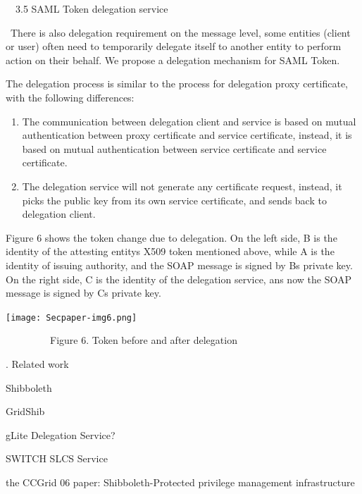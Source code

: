 \documentclass{article}
\newcommand\liststyleLv{%
\renewcommand\theenumi{\arabic{enumi}}
\renewcommand\theenumii{\arabic{enumii}}
\renewcommand\theenumiii{\arabic{enumiii}}
\renewcommand\theenumiv{\arabic{enumiv}}
\renewcommand\labelenumi{\theenumi.}
\renewcommand\labelenumii{\theenumii.}
\renewcommand\labelenumiii{\theenumiii.}
\renewcommand\labelenumiv{\theenumiv.}
}
\begin{document}
\bigskip

\ \ 3.5 SAML Token delegation service

\ There is also delegation requirement on the message level, some
entities (client or user) often need to temporarily delegate itself to
another entity to perform action on their behalf. We propose a
delegation mechanism for SAML Token. 

The delegation process is similar to the process for delegation proxy
certificate, with the following differences:

\liststyleLv
\begin{enumerate}
\item The communication between delegation client and service is based
on mutual authentication between proxy certificate and service
certificate, instead, it is based on mutual authentication between
service certificate and service certificate.
\item The delegation service will not generate any certificate request,
instead, it picks the public key from its own service certificate, and
sends back to delegation client.
\end{enumerate}
Figure 6 shows the token change due to delegation. On the left side, B
is the identity of the attesting entity{\textquotesingle}s X509 token
mentioned above, while A is the identity of issuing authority, and the
SOAP message is signed by B{\textquotesingle}s private key. On the
right side, C is the identity of the delegation service, ans now the
SOAP message is signed by C{\textquotesingle}s private key.


\bigskip



\begin{center}
\texttt{[image: Secpaper-img6.png]}
\end{center}
{\centering
\ \ \ \ \ \ \ \ \ Figure 6. Token before and after delegation
\par}


\bigskip


\bigskip


\bigskip


\bigskip

{. Related work
\par}

Shibboleth

GridShib

gLite Delegation Service?

SWITCH SLCS Service

the CCGrid 06 paper: Shibboleth-Protected privilege management
infrastructure
\end{document}
